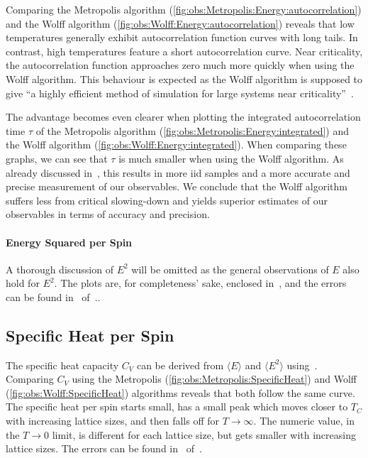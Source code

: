 		Comparing the Metropolis algorithm (\cref{fig:obs:Metropolis:Energy:autocorrelation}) and the Wolff algorithm (\cref{fig:obs:Wolff:Energy:autocorrelation}) reveals that low temperatures generally exhibit autocorrelation function curves with long tails. In contrast, high temperatures feature a short autocorrelation curve. Near criticality, the autocorrelation function approaches zero much more quickly when using the Wolff algorithm. This behaviour is expected as the Wolff algorithm is supposed to give \enquote{a highly efficient method of simulation for large systems near criticality}~\cite[p. 86]{sw}.
		
		The advantage becomes even clearer when plotting the integrated autocorrelation time $\tau$ of the Metropolis algorithm (\cref{fig:obs:Metropolis:Energy:integrated}) and the Wolff algorithm (\cref{fig:obs:Wolff:Energy:integrated}). When comparing these graphs, we can see that $\tau$ is much smaller when using the Wolff algorithm. As already discussed in~, this results in more iid samples and a more accurate and precise measurement of our observables. We conclude that the Wolff algorithm suffers less from critical slowing-down and yields superior estimates of our observables in terms of accuracy and precision.
	
	\paragraph{Energy Squared per Spin}\label{sec:res:energysquare} A thorough discussion of $E^2$ will be omitted as the general observations of $E$ also hold for $E^2$. The plots are, for completeness' sake, enclosed in~, and the errors can be found in~ of~..
	
	\subsection{Specific Heat per Spin}\label{sec:res:cv:observable}
		The specific heat capacity $C_V$ can be derived from $\langle E \rangle$ and $\langle E^2 \rangle$  using~. Comparing $C_V$ using the Metropolis (\cref{fig:obs:Metropolis:SpecificHeat}) and Wolff (\cref{fig:obs:Wolff:SpecificHeat}) algorithms reveals that both follow the same curve. The specific heat per spin starts small, has a small peak which moves closer to $T_C$ with increasing lattice sizes, and then falls off for $T\rightarrow \infty$. The numeric value, in the $T\rightarrow 0$ limit, is different for each lattice size, but gets smaller with increasing lattice sizes. The errors can be found in~ of~.
		

